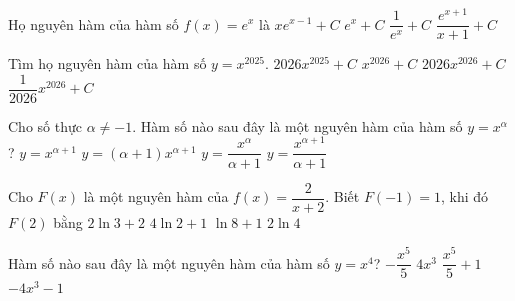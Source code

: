 \begin{ex}%
	Họ nguyên hàm của hàm số $f(x)=e^x$  là
	\choice 
		{$x e^{x-1}+C$} 
		{\True  $e^x+C$}
		{$\dfrac{1}{e^x}+C$} 
		{$\dfrac{e^{x+1}}{x+1}+C$} 
\end{ex}

\begin{ex}%
	Tìm họ  nguyên hàm của hàm số $ y=x^{2025} $.
	 \choice
		 {$2026x^{2025}+C$}
		 {$x^{2026}+C$}
		{$2026x^{2026}+C$} 
		{\True  $\dfrac{1}{2026}x^{2026}+C$}
\end{ex}

\begin{ex}%
	Cho số thực $\alpha \ne -1$. Hàm số nào sau  đây là một nguyên hàm của hàm số $y = x^\alpha$?
	 \choice
		{$y =  x^{\alpha+1}$}
		{$y = (\alpha+1)x^{\alpha+1}$} 
		{$y  = \dfrac{x^\alpha}{\alpha+1}$}
		{\True  $y = \dfrac{x^{\alpha+1}}{\alpha+1}$}
\end{ex}

\begin{ex}%
	Cho $F(x)$ là một nguyên hàm của $f(x)=\dfrac{2}{x+2}$. Biết $F(-1)=1$, khi đó $F(2)$  bằng
	\choice 
		{$2\ln  3+2$}
		 {\True $4\ln 2+1$}
		{$\ln 8+1$} 
		 {$2\ln 4$}
\end{ex}

\begin{ex}%
	Hàm số nào sau đây là một  nguyên hàm của hàm số $y=x^4$?
	\choice 
		{$-\dfrac{x^5}{5}$} 
		{$4x^3$} 
		 {\True$\dfrac{x^5}{5}+1$}
		 {$-4x^3-1$}
\end{ex}

